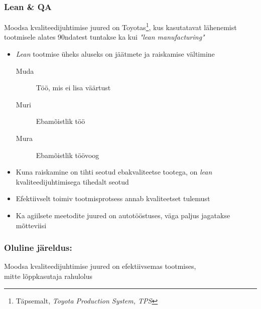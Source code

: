 \begin{frame}[fragile]
  \frametitle{Lean \& QA}
	Moodsa kvaliteedijuhtimise juured on Toyotas\footnote{Täpsemalt, \emph{Toyota Production System, TPS}}, kus kasutatavat lähenemist tootmisele alates 90ndatest tuntakse ka kui \emph{"lean manufacturing"}  

	\begin{itemize}
		\item \emph{Lean} tootmise üheks aluseks on jäätmete ja raiskamise vältimine
		\begin{description}
			\item[Muda] Töö, mis ei lisa väärtust
			\item[Muri] Ebamõistlik töö
			\item[Mura] Ebamõistlik töövoog
		\end{description}
		\item Kuna raiskamine on tihti seotud ebakvaliteetse tootega, on \emph{lean} kvaliteedijuhtimisega tihedalt seotud
		\item Efektiivselt toimiv tootmisprotsess annab kvaliteetset tulemust
		\item Ka agiilsete meetodite juured on autotööstuses, väga paljus jagatakse mõtteviisi
	\end{itemize}
\end{frame}

\begin{frame}[fragile]
	\frametitle{Oluline järeldus:}
	\vfill
	\begin{center}
		Moodsa kvaliteedijuhtimise juured on efektiivsemas tootmises,\\ mitte lõppkasutaja rahulolus
	\end{center}
	\vfill
\end{frame}


